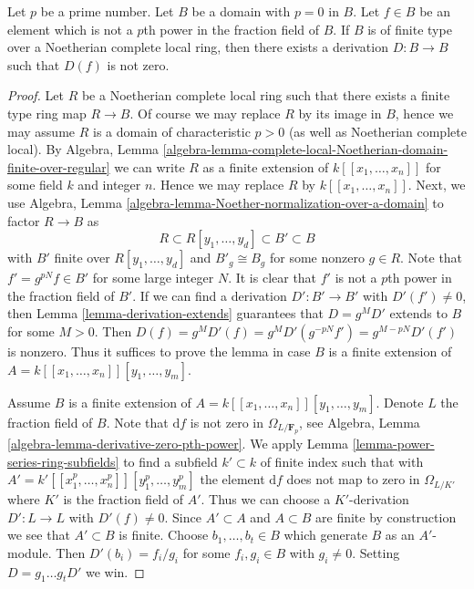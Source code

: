 \begin{lemma}
\label{lemma-find-D}
Let $p$ be a prime number. Let $B$ be a domain with $p = 0$ in $B$.
Let $f \in B$ be an element which is not a $p$th power in the fraction
field of $B$. If $B$ is of finite type over a Noetherian complete
local ring, then there exists a derivation $D : B \to B$ such that $D(f)$
is not zero.
\end{lemma}

\begin{proof}
Let $R$ be a Noetherian complete local ring such that there exists
a finite type ring map $R \to B$. Of course we may replace $R$ by
its image in $B$, hence we may assume $R$ is a domain of characteristic
$p > 0$ (as well as Noetherian complete local). By Algebra, Lemma
\ref{algebra-lemma-complete-local-Noetherian-domain-finite-over-regular}
we can write $R$ as a finite extension of $k[[x_1, \ldots, x_n]]$ for some
field $k$ and integer $n$. Hence we may replace $R$ by $k[[x_1, \ldots, x_n]]$.
Next, we use
Algebra, Lemma \ref{algebra-lemma-Noether-normalization-over-a-domain}
to factor $R \to B$ as
$$
R \subset R[y_1, \ldots, y_d] \subset B' \subset B
$$
with $B'$ finite over $R[y_1, \ldots, y_d]$ and $B'_g \cong B_g$
for some nonzero $g \in R$. Note that $f' = g^{pN} f \in B'$ for some
large integer $N$. It is clear that $f'$ is not a $p$th power in
the fraction field of $B'$. If we can find a derivation
$D' : B' \to B'$ with $D'(f') \not = 0$, then
Lemma \ref{lemma-derivation-extends}
guarantees that $D = g^MD'$ extends to $B$ for some $M > 0$. Then
$D(f) = g^MD'(f) = g^MD'(g^{-pN}f') = g^{M - pN}D'(f')$ is nonzero.
Thus it suffices to prove the lemma in case
$B$ is a finite extension of $A = k[[x_1, \ldots, x_n]][y_1, \ldots, y_m]$.

\medskip\noindent
Assume $B$ is a finite extension of
$A = k[[x_1, \ldots, x_n]][y_1, \ldots, y_m]$.
Denote $L$ the fraction field of $B$.
Note that $\text{d}f$ is not zero in $\Omega_{L/\mathbf{F}_p}$, see
Algebra, Lemma \ref{algebra-lemma-derivative-zero-pth-power}.
We apply Lemma \ref{lemma-power-series-ring-subfields} to find a subfield
$k' \subset k$ of finite index such that with
$A' = k'[[x_1^p, \ldots, x_n^p]][y_1^p, \ldots, y_m^p]$
the element $\text{d}f$ does not map to zero in $\Omega_{L/K'}$
where $K'$ is the fraction field of $A'$.
Thus we can choose a $K'$-derivation $D' : L \to L$
with $D'(f) \not = 0$. Since $A' \subset A$ and $A \subset B$ are
finite by construction we see that $A' \subset B$ is finite.
Choose $b_1, \ldots, b_t \in B$ which generate $B$ as an $A'$-module.
Then $D'(b_i) = f_i/g_i$ for some $f_i, g_i \in B$ with $g_i \not = 0$.
Setting $D = g_1 \ldots g_t D'$ we win.
\end{proof}
